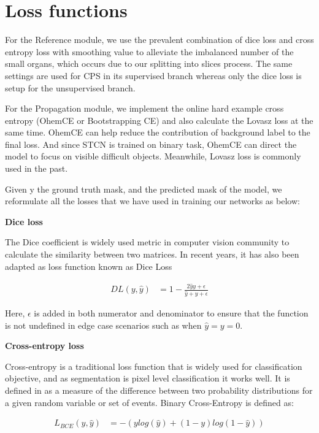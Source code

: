 \section{Loss functions}
\label{sec:loss}

For the Reference module, we use the prevalent combination of dice loss and cross entropy loss with smoothing value to alleviate the imbalanced number of the small organs, which occurs due to our splitting into slices process. The same settings are used for CPS in its supervised branch whereas only the dice loss is setup for the unsupervised branch. 

For the Propagation module, we implement the online hard example cross entropy (OhemCE or Bootstrapping CE) \cite{ohemce16wu} and also calculate the Lovasz loss \cite{lovasz18berman} at the same time. OhemCE can help reduce the contribution of background label to the final loss. And since STCN is trained on binary task, OhemCE can direct the model to focus on visible difficult objects. Meanwhile, Lovasz loss is commonly used in the past. 


Given y the ground truth mask, and  the predicted mask of the model, we reformulate all the losses that we have used in training our networks as below: 

\textbf{Dice loss}

The Dice coefficient is widely used metric in computer vision community to calculate the similarity between two matrices. In recent years, it has also been adapted as loss function known as Dice Loss \cite{sudre2017diceloss}

\begin{align}
        DL (y, \hat{y}) &= 1 - \frac{2\hat{y}y+\epsilon}{\hat{y}+y+\epsilon}
\end{align}

Here, $\epsilon$ is added in both numerator and denominator to ensure that the function is not undefined in edge case scenarios such as when $\hat{y} = y = 0$.

\textbf{Cross-entropy loss}

Cross-entropy is a traditional loss function that is widely used for classification objective, and as segmentation is pixel level classification it works well. It is defined in \cite{yi2004ce} as a measure of the difference between two probability distributions for a given random variable or set of events.
Binary Cross-Entropy is defined as:

\begin{align}
        L_{BCE} (y, \hat{y}) &= -(y log (\hat{y}) + (1-y)log(1-\hat{y}))
\end{align}

